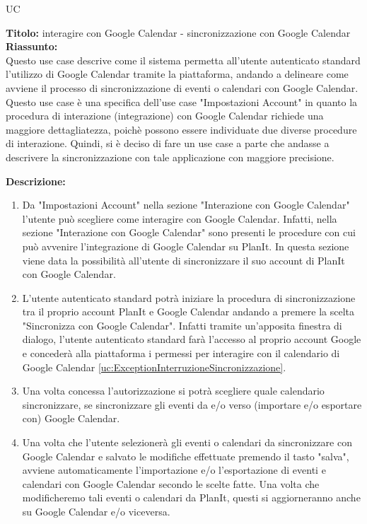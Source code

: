 \begin{listaPersonale}{UC}
\begin{listaPersonale2}[UC] {}
        \begin{listaPersonale3} [UD]{}
            \textbf{Titolo:} interagire con Google Calendar - sincronizzazione con Google Calendar\\

            \textbf{Riassunto:} \\
            Questo use case descrive come il sistema permetta all'utente autenticato standard l'utilizzo di Google Calendar tramite la piattaforma, andando a delineare come avviene il processo di sincronizzazione di eventi o calendari con Google Calendar.
            Questo use case è una specifica dell'use case "Impostazioni Account" in quanto la procedura di interazione (integrazione) con Google Calendar richiede una maggiore dettagliatezza, poichè possono essere individuate due diverse procedure di interazione. Quindi, si è deciso di fare un use case a parte che andasse a descrivere la sincronizzazione con tale applicazione con maggiore precisione.

            \textbf{Descrizione:} \\
            \begin{enumerate}
                \item Da "Impostazioni Account" nella sezione "Interazione con Google Calendar" l'utente può scegliere come interagire con Google Calendar. Infatti, nella sezione "Interazione con Google Calendar" sono presenti le procedure con cui può avvenire l'integrazione di Google Calendar su PlanIt. In questa sezione viene data la possibilità all'utente di sincronizzare il suo account di PlanIt con Google Calendar.
                \item L'utente autenticato standard potrà iniziare la procedura di sincronizzazione tra il proprio account PlanIt e Google Calendar andando a premere la scelta "Sincronizza con Google Calendar". Infatti tramite un'apposita finestra di dialogo, l'utente autenticato standard farà l'accesso al proprio account Google e concederà alla piattaforma i permessi per interagire con il calendario di Google Calendar \ref{uc:ExceptionInterruzioneSincronizzazione}.
                \item Una volta concessa l'autorizzazione si potrà scegliere quale calendario sincronizzare, se sincronizzare gli eventi da e/o verso (importare e/o esportare con) Google Calendar.
                \item Una volta che l'utente selezionerà gli eventi o calendari da sincronizzare con Google Calendar e salvato le modifiche effettuate premendo il tasto "salva", avviene automaticamente l'importazione e/o l'esportazione di eventi e calendari con Google Calendar secondo le scelte fatte. Una volta che modificheremo tali eventi o calendari da PlanIt, questi si aggiorneranno anche su Google Calendar e/o viceversa.
            \end{enumerate}


\end{listaPersonale3}
\end{listaPersonale2}
\end{listaPersonale}
